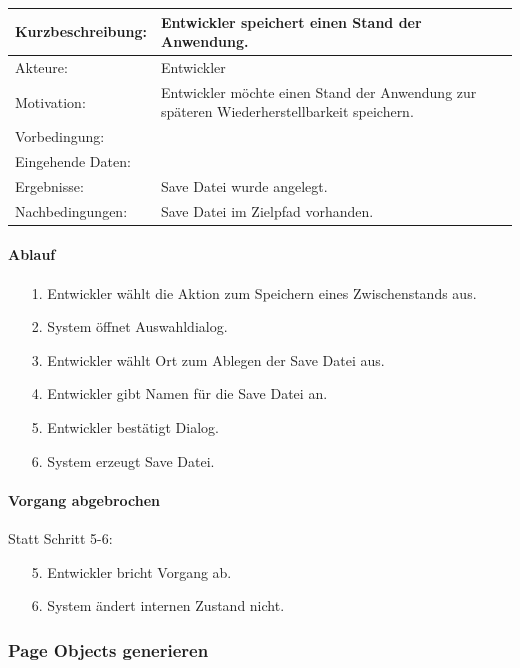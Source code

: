 \begin{tabular}[h]{|p{4cm}|p{}|}
\hline 
\rule[-1ex]{0pt}{2.5ex}Kurzbeschreibung: & 
Entwickler speichert einen Stand der Anwendung. \\  
\hline 
\rule[-1ex]{0pt}{2.5ex}Akteure: & 
Entwickler \\ 
\hline 
\rule[-1ex]{0pt}{2.5ex}Motivation: & 
Entwickler möchte einen Stand der Anwendung zur späteren Wiederherstellbarkeit speichern. \\ 
\hline 
\rule[-1ex]{0pt}{2.5ex}Vorbedingung: &  \\ 
\hline 
\rule[-1ex]{0pt}{2.5ex}Eingehende Daten: & \\ 
\hline 
\rule[-1ex]{0pt}{2.5ex}Ergebnisse: & Save Datei wurde angelegt. \\ 
\hline 
\rule[-1ex]{0pt}{2.5ex}Nachbedingungen: & Save Datei im Zielpfad vorhanden.  \\ 
\hline 
\end{tabular} 

\paragraph{Ablauf}

\begin{itemize}[itemsep=0pt]
\item[1.] Entwickler wählt die Aktion zum Speichern eines Zwischenstands aus.
\item[2.] System öffnet Auswahldialog. 
\item[3.] Entwickler wählt Ort zum Ablegen der Save Datei aus.
\item[4.] Entwickler gibt Namen für die Save Datei an.
\item[5.] Entwickler bestätigt Dialog.
\item[6.] System erzeugt Save Datei.
\end{itemize}

\paragraph{Vorgang abgebrochen}
Statt Schritt 5-6:
\begin{itemize}[itemsep=0pt]
\item[5.] Entwickler bricht Vorgang ab. 
\item[6.] System ändert internen Zustand nicht. 
\end{itemize}

\subsubsection{Page Objects generieren}
\label{sec:generate_page_objects}


